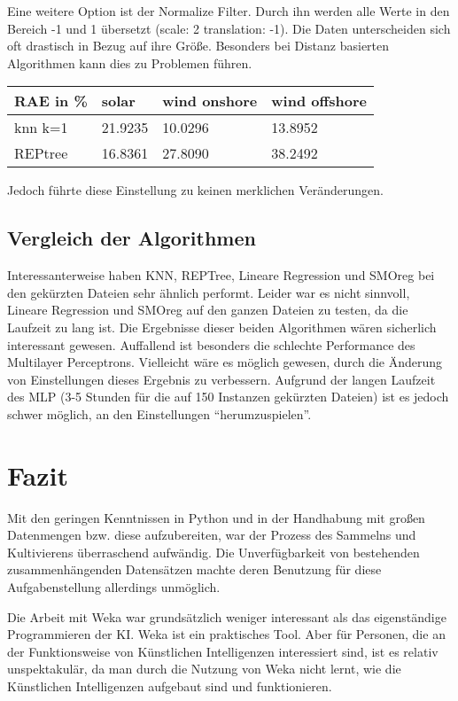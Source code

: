\documentclass[letterpaper]{article} %
\begin{document}
    Eine weitere Option ist der Normalize Filter. Durch ihn werden alle Werte in den Bereich -1 und 1 übersetzt (scale: 2 translation: -1). Die Daten unterscheiden sich oft drastisch in Bezug auf ihre Größe. Besonders bei Distanz basierten Algorithmen kann dies zu Problemen führen.
    \hfill\break
    \begin{center}
        \begin{tabular}{|l||l|l|l|}
            \hline
            RAE in \%&solar&wind onshore&wind offshore\\
            \hline
            \hline
            knn k=1&21.9235&10.0296&13.8952\\
            \hline
            REPtree&16.8361&27.8090&38.2492\\
            \hline
        \end{tabular}
    \end{center}
    \hfill\break
    Jedoch führte diese Einstellung zu keinen merklichen Veränderungen.

    \subsection*{Vergleich der Algorithmen}
    Interessanterweise haben KNN, REPTree, Lineare Regression und SMOreg bei den gekürzten Dateien sehr ähnlich performt. Leider war es nicht sinnvoll, Lineare Regression und SMOreg auf den ganzen Dateien zu testen, da die Laufzeit zu lang ist. Die Ergebnisse dieser beiden Algorithmen wären sicherlich interessant gewesen. Auffallend ist besonders die schlechte Performance des Multilayer Perceptrons. Vielleicht wäre es möglich gewesen, durch die Änderung von Einstellungen dieses Ergebnis zu verbessern. Aufgrund der langen Laufzeit des MLP (3-5 Stunden für die auf 150 Instanzen gekürzten Dateien) ist es jedoch schwer möglich, an den Einstellungen “herumzuspielen”.

\section*{Fazit}
    Mit den geringen Kenntnissen in Python und in der Handhabung mit großen Datenmengen bzw. diese aufzubereiten, war der Prozess des Sammelns und Kultivierens überraschend aufwändig. Die Unverfügbarkeit von bestehenden zusammenhängenden Datensätzen machte deren Benutzung für diese Aufgabenstellung allerdings unmöglich. 
    
    Die Arbeit mit Weka war grundsätzlich weniger interessant als das eigenständige Programmieren der KI. Weka ist ein praktisches Tool. Aber für Personen, die an der Funktionsweise von Künstlichen Intelligenzen interessiert sind, ist es relativ unspektakulär, da man durch die Nutzung von Weka nicht lernt, wie die Künstlichen Intelligenzen aufgebaut sind und funktionieren.
    
\end{document}

